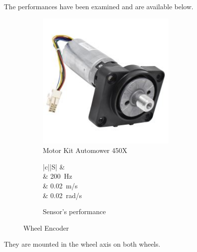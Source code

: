 The performances have been examined and are available below.

\begin{figure}[!ht]
	\begin{center}
		\begin{subfigure}[b]{.5\textwidth}
			\centering
			\includegraphics[width=0.75\textwidth]{Images/4-Methods/MotorEnc.jpeg}
			\caption{Motor Kit Automower 450X }
			\label{fig:wheelenc}
		\end{subfigure}%
		\begin{subfigure}[b]{.45\textwidth}
				\begin{center}
					\label{tab:evalWheels}
					\begin{tabular}{|c||S|}
						\hline
						 &   \\
						\hline
						\hline
						 &  \SI{200}{Hz} \\
						\hline
						 &  \SI{0.02}{\meter/\second} \\
						\hline
						\centering{$\boldsymbol \eta_{\omega}$} & \SI{0.02}{\radian/\second} \\
						\hline
					\end{tabular}
					\caption{Sensor's performance}
				\end{center}
		\end{subfigure}
		\caption{Wheel Encoder }
		\label{fig:wheel}
	\end{center}
\end{figure}

They are mounted in the wheel axis on both wheels.

